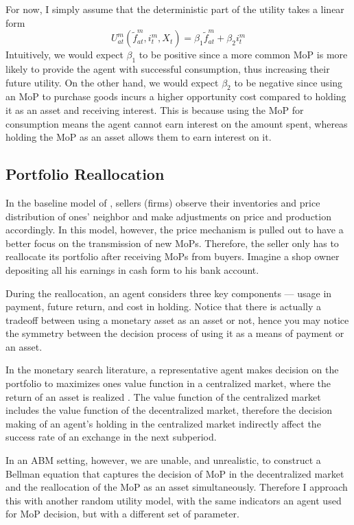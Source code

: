 For now, I simply assume that the deterministic part of the utility takes a
linear form
\begin{equation}
   U^m_{at}(\tilde{f}^m_{at}, i^m_t, X_t) = \beta_1 \tilde{f}^m_{at} + \beta_2 i^m_t
\end{equation}
Intuitively, we would expect $\beta_1$ to be positive since a more common MoP is
more likely to provide the agent with successful consumption, thus increasing
their future utility. On the other hand, we would expect $\beta_2$ to be
negative since using an MoP to purchase goods incurs a higher opportunity cost
compared to holding it as an asset and receiving interest. This is because using
the MoP for consumption means the agent cannot earn interest on the amount
spent, whereas holding the MoP as an asset allows them to earn interest on it.

\subsection{Portfolio Reallocation}

In the baseline model of \citet*{HandbookABM}, sellers (firms) observe their
inventories and price distribution of ones' neighbor and make adjustments on
price and production accordingly. In this model, however, the price mechanism is
pulled out to have a better focus on the transmission of new MoPs. Therefore,
the seller only has to reallocate its portfolio after receiving MoPs from
buyers. Imagine a shop owner depositing all his earnings in cash form to his
bank account.

During the reallocation, an agent considers three key components --- usage in
payment, future return, and cost in holding. Notice that there is actually a
tradeoff between using a monetary asset as an asset or not, hence you may notice
the symmetry between the decision process of using it as a means of payment or
an asset.

In the monetary search literature, a representative agent makes decision on the
portfolio to maximizes ones value function in a centralized market, where the
return of an asset is realized \citep*{LW05,LiLi19}. The value function of the centralized market includes the value function of the decentralized market, therefore the decision making of an agent's holding in the centralized market indirectly affect the success rate of an exchange in the next subperiod.

In an ABM setting, however, we are unable, and unrealistic, to construct a
Bellman equation that captures the decision of MoP in the decentralized market
and the reallocation of the MoP as an asset simultaneously. Therefore I approach
this with another random utility model, with the same indicators an agent used
for MoP decision, but with a different set of parameter.

